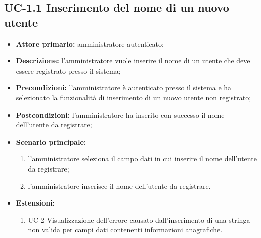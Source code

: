 \subsection{UC-1.1 Inserimento del nome di un nuovo utente}
\begin{itemize}
	\item \textbf{Attore primario:} amministratore autenticato;

	\item \textbf{Descrizione:} l'amministratore vuole inserire il nome di un utente che deve essere registrato presso il sistema;

	\item \textbf{Precondizioni:} l'amministratore è autenticato presso il sistema e ha selezionato la funzionalità di inserimento di un nuovo utente non registrato;

	\item \textbf{Postcondizioni:} l'amministratore ha inserito con successo il nome dell'utente da registrare;

	\item \textbf{Scenario principale:}
	      \begin{enumerate}
		      \item l'amministratore seleziona il campo dati in cui inserire il nome dell'utente da registrare;
		      \item l'amministratore inserisce il nome dell'utente da registrare.
	      \end{enumerate}
	\item \textbf{Estensioni:}
	      \begin{enumerate}
		      \item UC-2 Visualizzazione dell'errore causato dall'inserimento di una stringa non valida per campi dati contenenti informazioni anagrafiche.
	      \end{enumerate}
\end{itemize}
